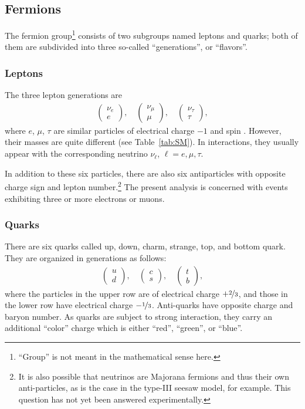 \subsection{Fermions}
The fermion group\footnote{``Group'' is not meant in the mathematical sense here.} consists of two subgroups named leptons and quarks; both of them are subdivided into three so-called ``generations'', or ``flavors''.

\subsubsection*{Leptons}
The three lepton generations are
\begin{eqnarray}
	\begin{pmatrix}\nu_e \\ e \end{pmatrix}, \quad
	\begin{pmatrix}\nu_\mu \\ \mu \end{pmatrix}, \quad
	\begin{pmatrix}\nu_\tau \\ \tau \end{pmatrix},
\end{eqnarray}
where $e$, $\mu$, $\tau$ are similar particles of electrical charge $-1$ and spin . However, their masses are quite different (see Table~\ref{tab:SM}). In interactions, they usually appear with the corresponding neutrino $\nu_\ell$, $\ell = e, \mu, \tau$.

In addition to these six particles, there are also six antiparticles with opposite charge sign and lepton number.\footnote{It is also possible that neutrinos are Majorana fermions and thus their own anti-particles, as is the case in the type-III seesaw model, for example. This question has not yet been answered experimentally.} The present analysis is concerned with events exhibiting three or more electrons or muons.

\subsubsection*{Quarks}
There are six quarks called up, down, charm, strange, top, and bottom quark. They are organized in generations as follows:
\begin{eqnarray}
	\begin{pmatrix}u \\ d \end{pmatrix}, \quad
	\begin{pmatrix}c \\ s \end{pmatrix}, \quad
	\begin{pmatrix}t \\ b \end{pmatrix},
\end{eqnarray}
where the particles in the upper row are of electrical charge $+\nicefrac{2}{3}$, and those in the lower row have electrical charge $-\nicefrac{1}{3}$. Anti-quarks have opposite charge and baryon number. As quarks are subject to strong interaction, they carry an additional ``color'' charge which is either ``red'', ``green'', or ``blue''.

